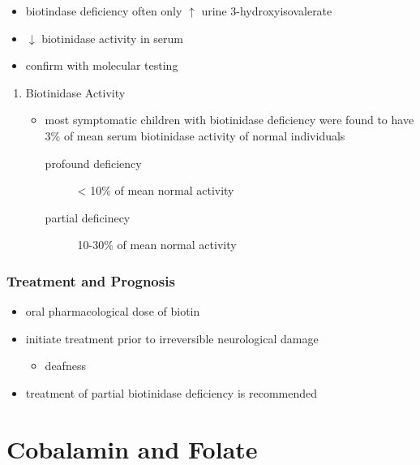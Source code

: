 \documentclass{scrartcl}
\begin{document}
\begin{itemize}
\item biotindase deficiency often only \(\uparrow\) urine 3-hydroxyisovalerate
\item \(\downarrow\) biotinidase activity in serum
\item confirm with molecular testing
\end{itemize}

\begin{enumerate}
\item Biotinidase Activity
\label{sec:orgaf70a56}
\begin{itemize}
\item most symptomatic children with biotinidase deficiency were found to
have 3\% of mean serum biotinidase activity of normal individuals
\begin{description}
\item[{profound deficiency}] \textless{} 10\% of mean normal activity
\item[{partial deficinecy}] 10-30\% of mean normal activity
\end{description}
\end{itemize}
\end{enumerate}

\subsubsection{Treatment and Prognosis}
\label{sec:orga375423}
\begin{itemize}
\item oral pharmacological dose of biotin
\item initiate treatment prior to irreversible neurological damage
\begin{itemize}
\item deafness
\end{itemize}
\item treatment of partial biotinidase deficiency is recommended
\end{itemize}

\section{Cobalamin and Folate}
\label{sec:org0066fe5}
\end{document}
